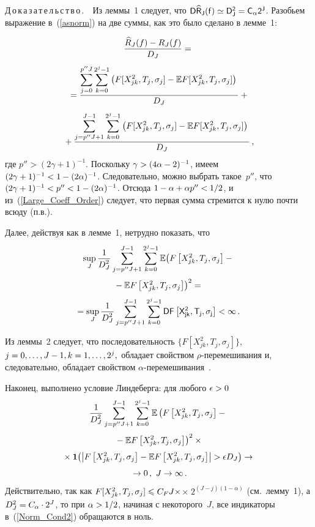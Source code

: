 \begin{multicols}{2}
\medskip

\noindent
Д\,о\,к\,а\,з\,а\,т\,е\,л\,ь\,с\,т\,в\,о\,.\ \ Из леммы~1 следует, что 
$\Variance \widehat{R}_J(f)\simeq D_J^2\hm=C_\alpha 2^J$. 
Разобьем выражение в~(\ref{asnorm}) на две суммы, как это было сделано в лемме~1:

\noindent
\begin{multline*}
\displaystyle\frac{\displaystyle \widehat{R}_J(f) - R_J(f)\mathstrut}{\displaystyle  D_J \mathstrut}={}\\[3pt]
{}=
\displaystyle\frac{\displaystyle \sum\limits_{j=0}^{p''J}\sum\limits_{k=0}^{2^j-1}
\left(F[X_{jk}^2,T_j,\sigma_j]-\mathbb{E} F[X_{jk}^2,T_j,\sigma_j]\right)\mathstrut}{\displaystyle  D_J \mathstrut}+{}\\[3pt]
{}+\displaystyle\frac{\displaystyle \sum\limits_{j=p''J+1}^{J-1}\sum\limits_{k=0}^{2^j-1}
\left(F[X_{jk}^2,T_j,\sigma_j]-\mathbb{E} F[X_{jk}^2,T_j,\sigma_j]\right)\mathstrut}{\displaystyle  D_J \mathstrut}\,,
\end{multline*}
где $p''>(2\gamma+1)^{-1}$. Поскольку $\gamma\hm > (4\alpha-2)^{-1}$, 
имеем $(2\gamma+1)^{-1}\hm<1\hm-(2\alpha)^{-1}$. Следовательно, можно выбрать такое~$p''$, 
что $(2\gamma\hm+1)^{-1}\hm<p''\hm<1\hm-(2\alpha)^{-1}$. Отсюда 
$1\hm-\alpha\hm+\alpha p''\hm<1/2$, и из~(\ref{Large_Coeff_Order}) 
следует, что первая сумма стремится к нулю почти всюду (п.в.).

Далее, действуя как в лемме~1, нетрудно показать, что
\begin{multline*}
\sup_J \displaystyle\frac{\displaystyle 1\mathstrut}{\displaystyle D^2_J\mathstrut}\sum\limits_{j=p''J+1}^{J-1}\sum\limits_{k=0}^{2^j-1} 
\mathbb{E}  \bigl( F\left[X_{jk}^2,T_j,\sigma_j\right] -{}\\[3pt]
 {}-
\mathbb{E}  F\left[X_{jk}^2,T_j,\sigma_j\right]\bigr)^2 ={}\\[3pt]
=\sup_J \displaystyle\frac{\displaystyle 1\mathstrut}{\displaystyle D^2_J\mathstrut}\sum\limits_{j=p''J+1}^{J-1}\sum\limits_{k=0}^{2^j-1} \sf D  
F\left[X_{jk}^2,T_j,\sigma_j\right] < \infty\,.
\end{multline*}

Из леммы~2 следует, что последовательность $\bigl\{F[X_{jk}^2,T_j,\sigma_j]\bigr\}$, 
$j \hm=0, \dots, J-1, k=1,\dots,2^j,$ обладает свойством $\rho$-пе\-ре\-ме\-ши\-ва\-ния 
и, следовательно, обладает свойством $\alpha$-пе\-ре\-ме\-ши\-ва\-ния~\cite{19-she}.
\par Наконец, выполнено условие Линдеберга: для любого $\epsilon\hm>0$
\begin{multline}
\displaystyle\frac{\displaystyle 1\mathstrut}{\displaystyle D^2_J\mathstrut}\sum\limits_{j=p''J+1}^{J-1}\sum\limits_{k=0}^{2^j-1} \mathbb{E}  
\left( F\left[X_{jk}^2,T_j,\sigma_j\right] - {}\right.\\[3pt]
\left.{}-
\mathbb{E} F\left[X_{jk}^2,T_j,\sigma_j\right]\right)^2\times{}\\[3pt] 
{}\times\mathbf{1}\bigl( \left\vert F\left[X_{jk}^2,T_j,\sigma_j\right] - \mathbb{E}  
F\left[X_{jk}^2,T_j,\sigma_j\right]\right\vert >\epsilon D_J\bigr)\rightarrow {}\\[3pt]
{}\rightarrow
0\,,\ J\rightarrow\infty\,.
\label{Norm_Cond2}
\end{multline}
Действительно, так как $F[X_{jk}^2,T_j,\sigma_j]\hm \leqslant C_F
J\times$\linebreak $\times\;2^{(J-j)(1-\alpha)}$ (см.\ лемму~1), а $D_J^2\hm=C_\alpha \cdot2^J$, то при
$\alpha\hm>1/2$, начиная с некоторого~$J$, все индикаторы в~(\ref{Norm_Cond2}) обращаются в ноль.


\end{multicols}
